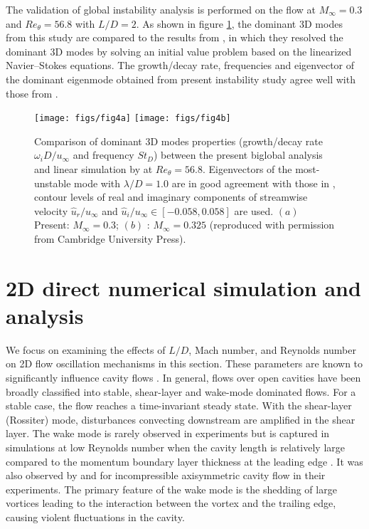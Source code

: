 \documentclass{jfm}
\begin{document}

The validation of global instability analysis is performed on the flow at $M_\infty=0.3$ and $Re_\theta=56.8$ with $L/D=2$. As shown in figure \ref{fig:BiG_Bres}, the dominant 3D modes from this study are compared to the results from \cite{Bres:JFM08}, in which they resolved the dominant 3D modes by solving an initial value problem based on the linearized Navier--Stokes equations. The growth/decay rate, frequencies and eigenvector of the dominant eigenmode obtained from present instability study agree well with those from \cite{Bres:JFM08}.
\begin{figure}
\begin{center}
  \texttt{[image: figs/fig4a]}
    \texttt{[image: figs/fig4b]}
   \caption{Comparison of dominant 3D modes properties (growth/decay rate $\omega_i D/u_\infty$ and frequency $St_D$) between the present biglobal analysis and linear simulation by \cite{Bres:2007} at $Re_\theta=56.8$. Eigenvectors of the most-unstable mode with $\lambda/D=1.0$ are in good agreement with those in \cite{Bres:2007}, contour levels of real and imaginary components of streamwise velocity $\hat u_r/u_\infty$ and $\hat u_i/u_\infty \in[-0.058,0.058]$ are used. $(a)$ Present: $M_\infty=0.3$; $(b)$ \cite{Bres:2007}: $M_\infty=0.325$ (reproduced with permission from Cambridge University Press).}
   \label{fig:BiG_Bres}
\end{center}
\end{figure}

\section{2D direct numerical simulation and analysis}\label{sec:results}

We focus on examining the effects of $L/D$, Mach number, and Reynolds number on 2D flow oscillation mechanisms in this section. These parameters are known to significantly influence cavity flows \citep{Krishnamurty:1956, Rowley:JFM02, Bres:JFM08, Lawson:PAS11}. In general, flows over open cavities have been broadly classified into stable, shear-layer and wake-mode dominated flows. For a stable case, the flow reaches a time-invariant steady state. With the shear-layer (Rossiter) mode, disturbances convecting downstream are amplified in the shear layer. The wake mode is rarely observed in experiments but is captured in simulations at low Reynolds number when the cavity length is relatively large compared to the momentum boundary layer thickness at the leading edge \citep{Rowley:JFM02, Sun:TCFD16}. It was also observed by \cite{Gharib:JFM87} and \cite{Zhang:EF11} for incompressible axisymmetric cavity flow in their experiments. The primary feature of the wake mode is the shedding of large vortices leading to the interaction between the vortex and the trailing edge, causing violent fluctuations in the cavity. 
\end{document}

